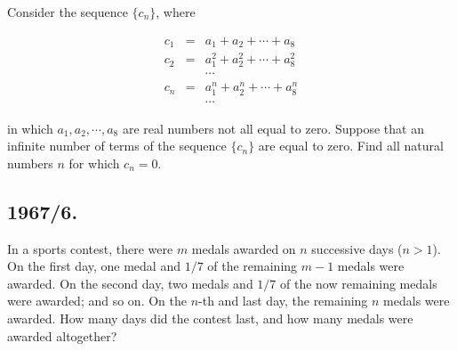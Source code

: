 \documentclass[12pt,thmsa]{article}
\begin{document}
Consider the sequence $\{c_{n}\}$, where

\begin{eqnarray*}
c_{1} &=&a_{1}+a_{2}+\cdots +a_{8} \\
c_{2} &=&a_{1}^{2}+a_{2}^{2}+\cdots +a_{8}^{2} \\
&&\cdots  \\
c_{n} &=&a_{1}^{n}+a_{2}^{n}+\cdots +a_{8}^{n} \\
&&\cdots 
\end{eqnarray*}

in which $a_{1},a_{2},\cdots ,a_{8}$ are real numbers not all equal to zero.
Suppose that an infinite number of terms of the sequence $\{c_{n}\}$ are
equal to zero. Find all natural numbers $n$ for which $c_{n}=0.$

\subsection{1967/6.}

In a sports contest, there were $m$ medals awarded on $n$ successive days ($%
n>1$). On the first day, one medal and $1/7$ of the remaining $m-1$ medals
were awarded. On the second day, two medals and $1/7$ of the now remaining
medals were awarded; and so on. On the $n$-th and last day, the remaining $n$
medals were awarded. How many days did the contest last, and how many medals
were awarded altogether?
\end{document}
